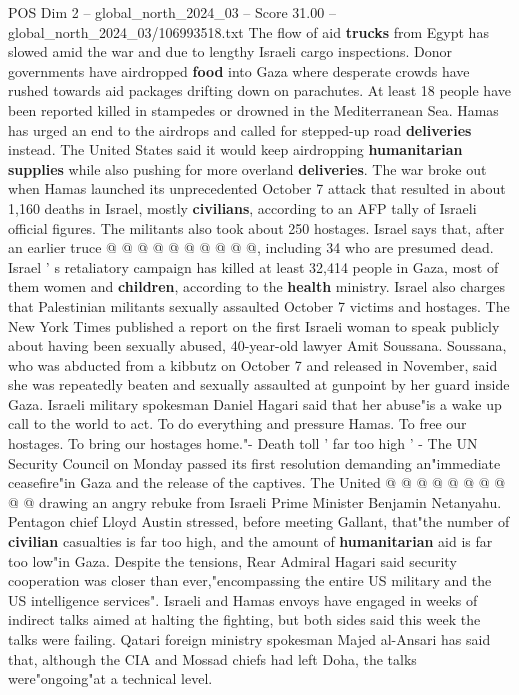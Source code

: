 \begin{textsample}{POS Dim 2 – global\_north\_2024\_03 – Score 31.00 – global\_north\_2024\_03/106993518.txt}
The flow of aid \textbf{trucks} from Egypt has slowed amid the war and due to lengthy Israeli cargo inspections.
Donor governments have airdropped \textbf{food} into Gaza where desperate crowds have rushed towards aid packages drifting down on parachutes.
At least 18 people have been reported killed in stampedes or drowned in the Mediterranean Sea.
Hamas has urged an end to the airdrops and called for stepped-up road \textbf{deliveries} instead.
The United States said it would keep airdropping \textbf{humanitarian} \textbf{supplies} while also pushing for more overland \textbf{deliveries}.
The war broke out when Hamas launched its unprecedented October 7 attack that resulted in about 1,160 deaths in Israel, mostly \textbf{civilians}, according to an AFP tally of Israeli official figures.
The militants also took about 250 hostages.
Israel says that, after an earlier truce @ @ @ @ @ @ @ @ @ @, including 34 who are presumed dead.
Israel ' s retaliatory campaign has killed at least 32,414 people in Gaza, most of them women and \textbf{children}, according to the \textbf{health} ministry.
Israel also charges that Palestinian militants sexually assaulted October 7 victims and hostages.
The New York Times published a report on the first Israeli woman to speak publicly about having been sexually abused, 40-year-old lawyer Amit Soussana.
Soussana, who was abducted from a kibbutz on October 7 and released in November, said she was repeatedly beaten and sexually assaulted at gunpoint by her guard inside Gaza.
Israeli military spokesman Daniel Hagari said that her abuse"is a wake up call to the world to act.
To do everything and pressure Hamas.
To free our hostages.
To bring our hostages home."- Death toll ' far too high ' - The UN Security Council on Monday passed its first resolution demanding an"immediate ceasefire"in Gaza and the release of the captives.
The United @ @ @ @ @ @ @ @ @ @ drawing an angry rebuke from Israeli Prime Minister Benjamin Netanyahu.
Pentagon chief Lloyd Austin stressed, before meeting Gallant, that"the number of \textbf{civilian} casualties is far too high, and the amount of \textbf{humanitarian} aid is far too low"in Gaza.
Despite the tensions, Rear Admiral Hagari said security cooperation was closer than ever,"encompassing the entire US military and the US intelligence services".
Israeli and Hamas envoys have engaged in weeks of indirect talks aimed at halting the fighting, but both sides said this week the talks were failing.
Qatari foreign ministry spokesman Majed al-Ansari has said that, although the CIA and Mossad chiefs had left Doha, the talks were"ongoing"at a technical level.

\end{textsample}
